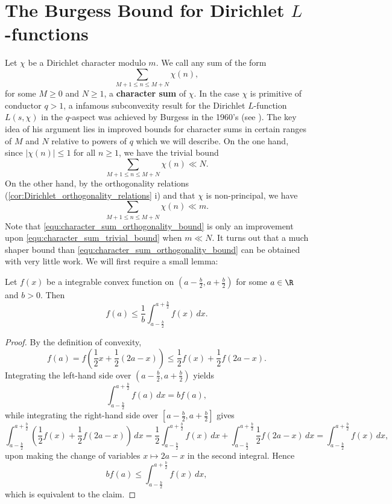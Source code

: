  \section{The Burgess Bound for Dirichlet \texorpdfstring{$L$}{L}-functions}
    Let $\chi$ be a Dirichlet character modulo $m$. We call any sum of the form
    \[
      \sum_{M+1 \le n \le M+N}\chi(n),
    \]
    for some $M \ge 0$ and $N \ge 1$, a \textbf{character sum} of $\chi$. In the case $\chi$ is primitive of conductor $q > 1$, a infamous subconvexity result for the Dirichlet $L$-function $L(s,\chi)$ in the $q$-aspect was achieved by Burgess in the 1960's (see \cite{burgess1963character}). The key idea of his argument lies in improved bounds for character sums in certain ranges of $M$ and $N$ relative to powers of $q$ which we will describe. On the one hand, since $|\chi(n)| \le 1$ for all $n \ge 1$, we have the trivial bound
    \begin{equation}\label{equ:character_sum_trivial_bound}
      \sum_{M+1 \le n \le M+N}\chi(n) \ll N.
    \end{equation}
    On the other hand, by the orthogonality relations (\cref{cor:Dirichlet_orthogonality_relations} i) and that $\chi$ is non-principal, we have
    \begin{equation}\label{equ:character_sum_orthogonality_bound}
      \sum_{M+1 \le n \le M+N}\chi(n) \ll m.
    \end{equation}
    Note that \cref{equ:character_sum_orthogonality_bound} is only an improvement upon \cref{equ:character_sum_trivial_bound} when $m \ll N$. It turns out that a much shaper bound than \cref{equ:character_sum_orthogonality_bound} can be obtained with very little work. We will first require a small lemma:

    \begin{lemma}\label{lem:Polya-Vinogradov_lemma}
      Let $f(x)$ be a integrable convex function on $\left(a-\frac{b}{2},a+\frac{b}{2}\right)$ for some $a \in \R$ and $b > 0$. Then
      \[
        f(a) \le \frac{1}{b}\int_{a-\frac{b}{2}}^{a+\frac{b}{2}}f(x)\,dx.
      \]
    \end{lemma}
    \begin{proof}
      By the definition of convexity,
      \[
        f(a) = f\left(\frac{1}{2}x+\frac{1}{2}(2a-x)\right) \le \frac{1}{2}f(x)+\frac{1}{2}f(2a-x).
      \]
      Integrating the left-hand side over $\left(a-\frac{b}{2},a+\frac{b}{2}\right)$ yields
      \[
        \int_{a-\frac{b}{2}}^{a+\frac{b}{2}}f(a)\,dx = bf(a),
      \]
      while integrating the right-hand side over $\left[a-\frac{b}{2},a+\frac{b}{2}\right]$ gives
      \[
        \int_{a-\frac{b}{2}}^{a+\frac{b}{2}}\left(\frac{1}{2}f(x)+\frac{1}{2}f(2a-x)\right)\,dx = \frac{1}{2}\int_{a-\frac{b}{2}}^{a+\frac{b}{2}}f(x)\,dx+\int_{a-\frac{b}{2}}^{a+\frac{b}{2}}\frac{1}{2}f(2a-x)\,dx = \int_{a-\frac{b}{2}}^{a+\frac{b}{2}}f(x)\,dx,
      \]
      upon making the change of variables $x \mapsto 2a-x$ in the second integral. Hence
      \[
        bf(a) \le \int_{a-\frac{b}{2}}^{a+\frac{b}{2}}f(x)\,dx,
      \]
      which is equivalent to the claim.
    \end{proof}
    

